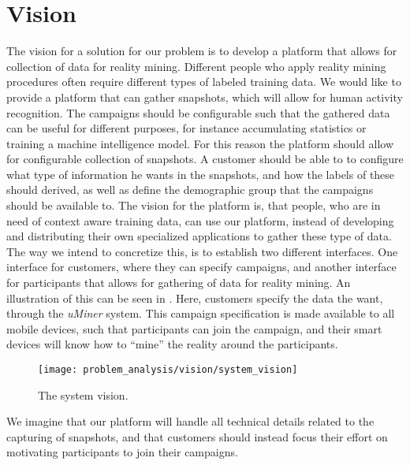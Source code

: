 \section{Vision}
\label{sec:vision}
The vision for a solution for our problem is to develop a platform that allows for collection of data for reality mining. Different people who apply reality mining procedures often require different types of labeled training data. We would like to provide a platform that can gather snapshots, which will allow for human activity recognition. The campaigns should be configurable such that the gathered data can be useful for different purposes, for instance accumulating statistics or training a machine intelligence model. For this reason the platform should allow for configurable collection of snapshots. A customer should be able to to configure what type of information he wants in the snapshots, and how the labels of these should derived, as well as define the demographic group that the campaigns should be available to. The vision for the platform is, that people, who are in need of context aware training data, can use our platform, instead of developing and distributing their own specialized applications to gather these type of data. The way we intend to concretize this, is to establish two different interfaces. One interface for customers, where they can specify campaigns, and another interface for participants that allows for gathering of data for reality mining. An illustration of this can be seen in . Here, customers specify the data the want, through the \emph{uMiner} system. This campaign specification is made available to all mobile devices, such that participants can join the campaign, and their smart devices will know how to ``mine'' the reality around the participants. 

\begin{figure}[!htbp]
    \centering
    \texttt{[image: problem\_analysis/vision/system\_vision]}
    \caption{The system vision.}
    \label{fig:system_vision}
\end{figure}
\FloatBarrier

We imagine that our platform will handle all technical details related to the capturing of snapshots, and that customers should instead focus their effort on motivating participants to join their campaigns. 


